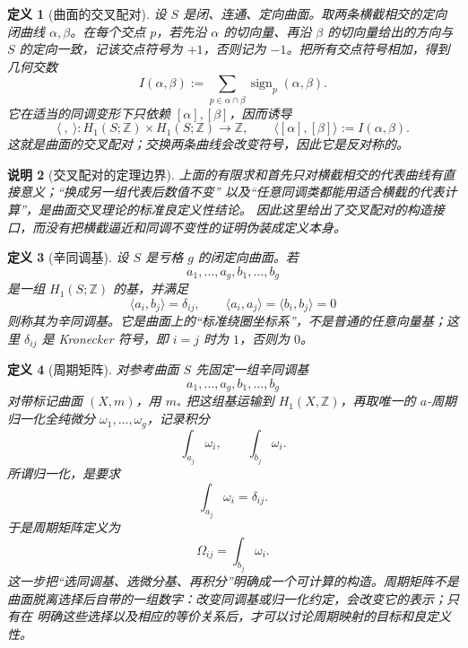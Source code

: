 \documentclass[UTF8,fontset=none,a4paper,11pt]{ctexart}
\theoremstyle{foundation-definition}
\newtheorem{definition}{定义}[section]
\theoremstyle{foundation-theorem}
\theoremstyle{foundation-proposition}
\theoremstyle{foundation-example}
\theoremstyle{foundation-remark}
\newtheorem{remark}[definition]{说明}
\theoremstyle{foundation-theorem}
\begin{document}
\begin{definition}[曲面的交叉配对]\label{def:intersection-pairing}
设 \(S\) 是闭、连通、定向曲面。取两条横截相交的定向闭曲线
\(\alpha,\beta\)。在每个交点 \(p\)，若先沿 \(\alpha\) 的切向量、再沿 \(\beta\) 的切向量给出的方向与 \(S\) 的定向一致，记该交点符号为 \(+1\)，否则记为 \(-1\)。把所有交点符号相加，得到几何交数
\[
I(\alpha,\beta):=\sum_{p\in\alpha\cap\beta}\operatorname{sign}_p(\alpha,\beta).
\]
它在适当的同调变形下只依赖 \([\alpha],[\beta]\)，因而诱导
\[
\langle\ ,\ \rangle:H_1(S;\mathbb Z)\times H_1(S;\mathbb Z)\to\mathbb Z,
\qquad
\langle[\alpha],[\beta]\rangle:=I(\alpha,\beta).
\]
这就是曲面的交叉配对；交换两条曲线会改变符号，因此它是反对称的。
\end{definition}

\begin{remark}[交叉配对的定理边界]\label{rem:intersection-pairing-status}
上面的有限求和首先只对横截相交的代表曲线有直接意义；“换成另一组代表后数值不变”
以及“任意同调类都能用适合横截的代表计算”，是曲面交叉理论的标准良定义性结论。
因此这里给出了交叉配对的构造接口，而没有把横截逼近和同调不变性的证明伪装成定义本身。
\end{remark}

\begin{definition}[辛同调基]\label{def:symplectic-homology-basis}
设 \(S\) 是亏格 \(g\) 的闭定向曲面。若
\[
a_1,\ldots,a_g,b_1,\ldots,b_g
\]
是一组 \(H_1(S;\mathbb Z)\) 的基，并满足
\[
\langle a_i,b_j\rangle=\delta_{ij},\qquad
\langle a_i,a_j\rangle=\langle b_i,b_j\rangle=0
\]
则称其为辛同调基。它是曲面上的“标准绕圈坐标系”，不是普通的任意向量基；这里 \(\delta_{ij}\) 是 Kronecker 符号，即 \(i=j\) 时为 \(1\)，否则为 \(0\)。
\end{definition}

\begin{definition}[周期矩阵]\label{def:period-matrix}
对参考曲面 \(S\) 先固定一组辛同调基
\[
a_1,\dots,a_g,b_1,\dots,b_g
\]
对带标记曲面 \((X,m)\)，用 \(m_*\) 把这组基运输到 \(H_1(X,\mathbb Z)\)，再取唯一的 \(a\)-周期归一化全纯微分 \(\omega_1,\dots,\omega_g\)，记录积分
\[
\int_{a_j}\omega_i,\qquad
\int_{b_j}\omega_i.
\]
所谓归一化，是要求
\[
\int_{a_j}\omega_i=\delta_{ij}.
\]
于是周期矩阵定义为
\[
\Omega_{ij}=\int_{b_j}\omega_i.
\]
这一步把“选同调基、选微分基、再积分”明确成一个可计算的构造。周期矩阵不是
曲面脱离选择后自带的一组数字：改变同调基或归一化约定，会改变它的表示；只有在
明确这些选择以及相应的等价关系后，才可以讨论周期映射的目标和良定义性。
\end{definition}
\end{document}
